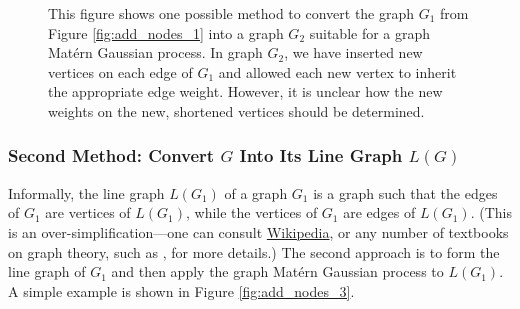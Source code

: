 \begin{figure}
    \begin{center}
    \end{center}
    \caption{This figure shows one possible method to convert the graph $G_1$ from Figure \ref{fig:add_nodes_1} into a graph $G_2$ suitable for a graph Mat\'{e}rn Gaussian process. In graph $G_2$, we have inserted new vertices on each edge of $G_1$ and allowed each new vertex to inherit the appropriate edge weight. However, it is unclear how the new weights on the new, shortened vertices should be determined.}
    \label{fig:add_nodes_2}
\end{figure}

\subsubsection{Second Method: Convert \texorpdfstring{$G$}{G} Into Its Line Graph \texorpdfstring{$L(G)$}{LofG}}

Informally, the line graph $L(G_1)$ of a graph $G_1$ is a graph such that the edges of $G_1$ are vertices of $L(G_1)$, while the vertices of $G_1$ are edges of $L(G_1)$. (This is an over-simplification---one can consult \href{https://en.wikipedia.org/wiki/Line_graph}{Wikipedia}, or any number of textbooks on graph theory, such as \cite{moderngraph}, for more details.) The second approach is to form the line graph of $G_1$ and then apply the graph Mat\'{e}rn Gaussian process to $L(G_1)$. A simple example is shown in Figure \ref{fig:add_nodes_3}.

